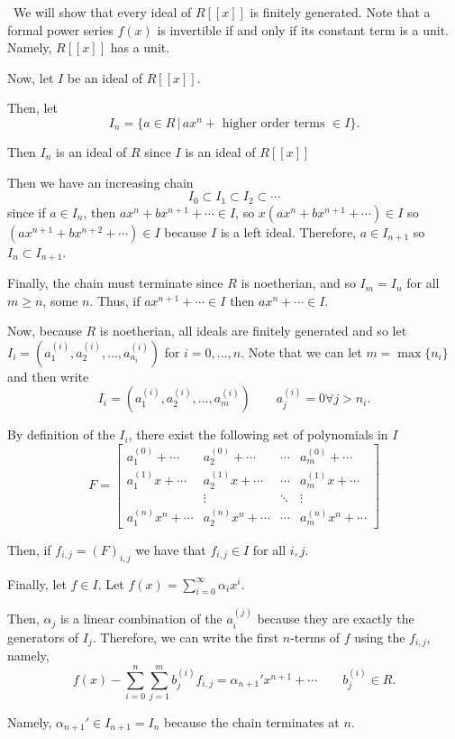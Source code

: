 \documentclass[12pt]{Qual}
\begin{document}
\begin{solution}$\,$
We will show that every ideal of $R[[x]]$ is finitely generated. Note that a formal power series $f(x)$ is invertible if and only if its constant term is a unit. Namely, $R[[x]]$ has a unit.

Now, let $I$ be an ideal of $R[[x]].$

Then, let $$I_n=\{a\in R\,|\, ax^n+\text{ higher order terms }\in I\}.$$

Then $I_n$ is an ideal of $R$ since $I$ is an ideal of $R[[x]]$

Then we have an increasing chain  $$I_0\subset I_1\subset I_2\subset\cdots$$ since if $a\in I_n$, then $ax^n+bx^{n+1}+\cdots\in I$, so $x(ax^n+bx^{n+1}+\cdots)\in I$ so $(ax^{n+1}+bx^{n+2}+\cdots)\in I$ because $I$ is a left ideal. Therefore, $a\in I_{n+1}$ so $I_n\subset I_{n+1}$.

Finally, the chain must terminate since $R$ is noetherian, and so $I_m=I_n$ for all $m\ge n$, some $n.$ Thus, if $ax^{n+1}+\cdots\in I$ then $ax^n+\cdots\in I$.

Now, because $R$ is noetherian, all ideals are finitely generated and so let $I_i=(a_1^{(i)},a_2^{(i)},...,a_{n_i}^{(i)})$ for $i=0,...,n$. Note that we can let $m=\max\{n_i\}$ and then write $$I_i=(a_1^{(i)},a_2^{(i)},...,a_m^{(i)})\qquad a_j^{(i)}=0\forall j>n_i.$$

By definition of the $I_i$, there exist the following set of polynomials in $I$ $$F=\begin{bmatrix}
a_1^{(0)}+\cdots & a_2^{(0)}+\cdots &\cdots & a_m^{(0)}+\cdots\\
a_1^{(1)}x+\cdots & a_2^{(1)}x+\cdots &\cdots & a_m^{(1)}x+\cdots\\
& \vdots & \ddots & \vdots\\
a_1^{(n)}x^n+\cdots & a_2^{(n)}x^n+\cdots &\cdots & a_m^{(n)}x^n+\cdots
\end{bmatrix}$$

Then, if $f_{i,j}=(F)_{i,j}$ we have that $f_{i,j}\in I$ for all $i,j$.

Finally, let $f\in I$. Let $\displaystyle f(x)=\sum_{i=0}^\infty\alpha_ix^i$.

Then, $\alpha_j$ is a linear combination of the $a_i^{(j)}$ because they are exactly the generators of $I_j$. Therefore, we can write the first $n$-terms of $f$ using the $f_{i,j}$, namely, $$f(x)-\sum_{i=0}^n\sum_{j=1}^mb_j^{(i)}f_{i,j}=\alpha_{n+1}'x^{n+1}+\cdots\qquad b_j^{(i)}\in R.$$

Namely, $\alpha_{n+1}'\in I_{n+1}=I_n$ because the chain terminates at $n$.


\end{solution}
\end{document}
